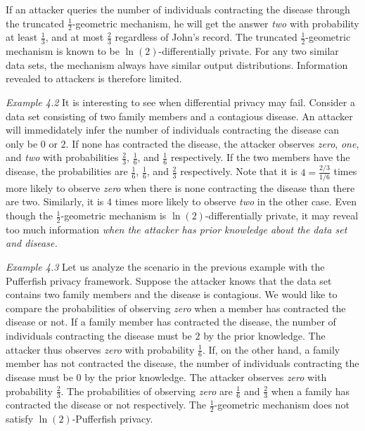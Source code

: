 If an attacker queries the number of individuals contracting the
disease through the truncated $\frac{1}{2}$-geometric mechanism,
he will get the answer \textit{two} with probability at least
$\frac{1}{3}$, and at most $\frac{2}{3}$ regardless of John's record. The truncated
$\frac{1}{2}$-geometric mechanism is known to be
$\ln(2)$-differentially private. For any two similar data sets, the
mechanism always have similar output distributions. Information
revealed to attackers is therefore limited.

\noindent
\textit{Example 4.2}
It is interesting to see when differential privacy may fail. Consider
a data set consisting of two family members and a contagious
disease. An attacker will immedidately infer the number of individuals
contracting the disease can only be $0$ or $2$. If none has contracted
the disease, the attacker observes \textit{zero}, \textit{one}, and
\textit{two} with probabilities $\frac{2}{3}$, $\frac{1}{6}$, and
$\frac{1}{6}$ respectively. If the two members have the disease, the
probabilities are $\frac{1}{6}$, $\frac{1}{6}$, and $\frac{2}{3}$
respectively. Note that it is $4 = \frac{2/3}{1/6}$ times more likely
to observe \textit{zero} when there is none contracting the disease
than there are two. Similarly, it is $4$ times more likely to observe
\textit{two} in the other case. Even though the
$\frac{1}{2}$-geometric mechanism is $\ln(2)$-differentially private,
it may reveal too much information \emph{when the attacker has prior
 knowledge about the data set and disease.}


\noindent
\textit{Example 4.3}
Let us analyze the scenario in the previous example with the
Pufferfish privacy framework. Suppose the attacker knows that the data
set contains two family members and the disease is contagious. We
would like to compare the probabilities of observing \textit{zero}
when a member has contracted the disease or not. If a family member
has contracted the disease, the number of individuals contracting
the disease must be $2$ by the prior knowledge. The attacker thus
observes \textit{zero} with probability $\frac{1}{6}$.
If, on the other hand, a family member has not contracted
the disease, the number of individuals contracting the disease must be
$0$ by the prior knowledge. The attacker observes \textit{zero}
with probability $\frac{2}{3}$. The probabilities of observing
\textit{zero} are $\frac{1}{6}$ and $\frac{2}{3}$ when a family
has contracted the disease or not respectively. The
$\frac{1}{2}$-geometric mechanism does not satisfy
$\ln(2)$-Pufferfish privacy.


